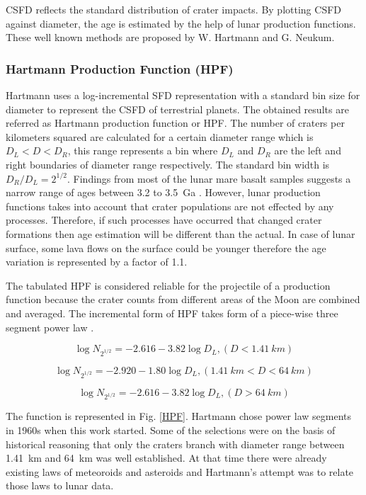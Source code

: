 \documentclass[11pt]{article}
\begin{document}
CSFD reflects the standard distribution of crater impacts. By plotting CSFD against diameter, the age is estimated by the help of lunar production functions. These well known methods are proposed by W. Hartmann and G. Neukum.

\subsubsection{Hartmann Production Function (HPF)}
Hartmann uses a log-incremental SFD representation with a standard bin size for diameter to represent the CSFD of terrestrial planets. The obtained results are referred as Hartmann production function or HPF. The number of craters per kilometers squared are calculated for a certain diameter range which is $D_{L} < D < D_{R}$, this range represents a bin where $D_{L}$ and $D_{R}$ are the left and right boundaries of diameter range respectively. The standard bin width is $D_{R}/D_{L} = 2^{1/2}$. Findings from most of the lunar mare basalt samples suggests a narrow range of ages between 3.2 to \SI{3.5}{Ga} \cite{stoffler2001stratigraphy}. However, lunar production functions takes into account that crater populations are not effected by any processes. Therefore, if such processes have occurred that changed crater formations then age estimation will be different than the actual. In case of lunar surface, some lava flows on the surface could be younger \cite{hiesinger2000ages} therefore the age variation is represented by a factor of 1.1.

The tabulated HPF is considered reliable for the projectile of a production function because the crater counts from different areas of the Moon are combined and averaged. The incremental form of HPF takes form of a piece-wise three segment power law \cite{ivanov2002comparison}.

\begin{equation}
\log N_{2^{1/2}} = -2.616 - 3.82 \log D_{L}, (D<\SI{1.41}{km})
\end{equation}

\begin{equation}
\log N_{2^{1/2}} = -2.920 - 1.80 \log D_{L},
(\SI{1.41}{km} < D < \SI{64}{km})
\end{equation}

\begin{equation}
\log N_{2^{1/2}} = -2.616 - 3.82 \log D_{L},
(D>\SI{64}{km})
\end{equation}

The function is represented in Fig. \ref{HPF}. Hartmann chose power law segments in 1960s when this work started. Some of the selections were on the basis of historical reasoning that only the craters branch with diameter range between \SI{1.41}{km} and \SI{64}{km} was well established. At that time there were already existing laws of meteoroids and asteroids and Hartmann's attempt was to relate those laws to lunar data.
\end{document}
